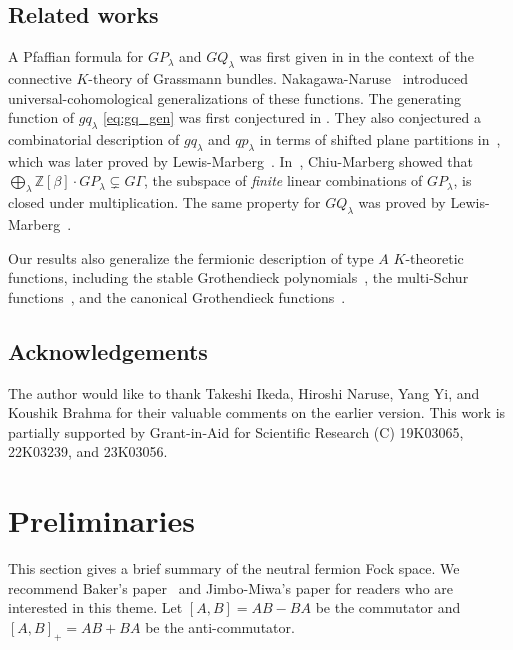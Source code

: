 \documentclass{amsart}
\def\ZZ{\mathord{\mathbb{Z}}}
\begin{document}
\subsection{Related works}

A Pfaffian formula for $GP_\lambda$ and $GQ_\lambda$ was first given in \cite{HUDSON2017115} in the context of the connective $K$-theory of Grassmann bundles.
Nakagawa-Naruse~\cite{nakagawa2016generalized,nakagawa2018universalfactrial,nakagawa2023universal} introduced universal-cohomological generalizations of these functions.
The generating function of $gq_\lambda$ \eqref{eq:gq_gen} was first conjectured in \cite{nakagawa2023universal}.
They also conjectured a combinatorial description of $gq_\lambda$ and $qp_\lambda$ in terms of shifted plane partitions in~\cite{nakagawa2018universalfactrial}, which was later proved by Lewis-Marberg~\cite{lewis2024combinatorial}.
In~\cite{chiu2023expanding}, Chiu-Marberg showed that $\bigoplus_{\lambda}\ZZ[\beta]\cdot GP_\lambda\subsetneq G\Gamma$, the subspace of \textit{finite} linear combinations of $GP_\lambda$, is closed under multiplication.
The same property for $GQ_\lambda$ was proved by Lewis-Marberg~\cite{lewis2024combinatorial}.

Our results also generalize the fermionic description of type $A$ $K$-theoretic functions, including the stable Grothendieck polynomials~\cite{iwao2020freefermion,iwao2022free}, the multi-Schur functions~\cite{iwao2023free}, and the canonical Grothendieck functions~\cite{iwao2024free}.




\subsection*{Acknowledgements}

The author would like to thank Takeshi Ikeda, Hiroshi Naruse, Yang Yi, and Koushik Brahma for their valuable comments on the earlier version.
This work is partially supported by Grant-in-Aid for Scientific Research (C) 19K03065, 22K03239, and 23K03056.


\section{Preliminaries}\label{sec:Pre}


This section gives a brief summary of the neutral fermion Fock space.
We recommend Baker's paper~\cite{baker1995symmetric} and Jimbo-Miwa's paper \cite{jimbo1983solitons} for readers who are interested in this theme.
Let $[A,B]=AB-BA$ be the commutator and $[A,B]_+=AB+BA$ be the anti-commutator.
\end{document}
